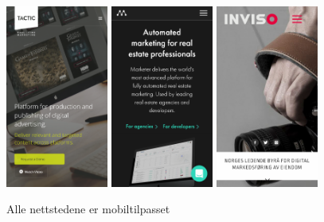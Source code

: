 \begin{figure}[bh]
    \begin{center}
        \includegraphics[width=0.3\textwidth]{line/tacticrealtime_com_(iPhone_6_7_8).png}
        \includegraphics[width=0.3\textwidth]{line/marketer_tech_(iPhone_6_7_8).png}
        \includegraphics[width=0.3\textwidth]{line/inviso_no_(iPhone_6_7_8).png}
        \caption{Alle nettstedene er mobiltilpasset}
        \label{fig:competitors-mobile}
    \end{center}
\end{figure}




